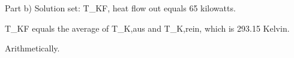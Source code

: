 Part b) Solution set: T_KF, heat flow out equals 65 kilowatts.

T_KF equals the average of T_K,aus and T_K,rein, which is 293.15 Kelvin.

Arithmetically.